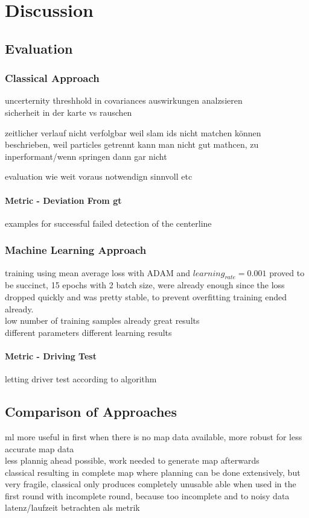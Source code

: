 \chapter{Discussion}

\section{Evaluation}
\subsection{Classical Approach}
uncerternity threshhold in covariances auswirkungen analzsieren\\
sicherheit in der karte vs rauschen

zeitlicher verlauf nicht verfolgbar weil
slam ids nicht matchen können beschrieben,
weil particles getrennt kann man nicht gut mathcen,
zu inperformant/wenn springen dann gar nicht

evaluation wie weit voraus notwendign sinnvoll etc
\subsubsection{Metric - Deviation From \ac{gt}}
examples for successful failed detection of the centerline


\subsection{Machine Learning Approach}

training using mean average loss with ADAM and 
$learning_{rate}=0.001$ proved to be succinct, 15 epochs with 2 batch size, were already enough since the loss dropped quickly and was pretty stable, to prevent overfitting training ended already.\\
low number of training samples already great results\\
different parameters different learning results


\subsubsection{Metric - Driving Test}
letting driver test according to algorithm 

\section{Comparison of Approaches}
ml more useful in first when there is no map data available, more robust for less accurate map data\\
less plannig ahead possible, work needed to generate map afterwards\\
classical resulting in complete map where planning can be done extensively, but very fragile,
classical only produces completely unusable able when used in the first round with incomplete round, because too incomplete and to noisy data
latenz/laufzeit betrachten als metrik

